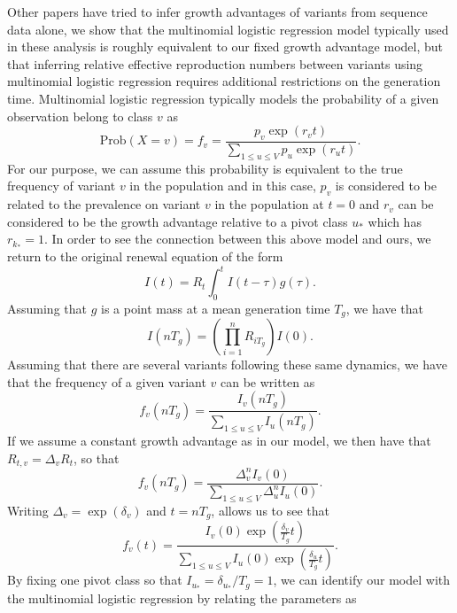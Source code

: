 \documentclass[11pt,oneside,letterpaper]{article}
\begin{document}
Other papers have tried to infer growth advantages of variants from sequence data alone, we show that the multinomial logistic regression model typically used in these analysis is roughly equivalent to our fixed growth advantage model, but that inferring relative effective reproduction numbers between variants using multinomial logistic regression requires additional restrictions on the generation time.
Multinomial logistic regression typically models the probability of a given observation belong to class $v$ as
\begin{equation}
  \text{Prob}(X = v) = f_{v} = \frac{p_{v}\exp(r_{v} t)}{\sum_{1\leq u\leq V} p_{u}\exp(r_{u} t)}.
\end{equation}
For our purpose, we can assume this probability is equivalent to the true frequency of variant $v$ in the population and in this case, $p_{v}$ is considered to be related to the prevalence on variant $v$ in the population at $t=0$ and $r_{v}$ can be considered to be the growth advantage relative to a pivot class $u_{*}$ which has $r_{k_{*}} = 1$.
In order to see the connection between this above model and ours, we return to the original renewal equation of the form
\begin{equation}
  I(t) = R_{t}\int_{0}^{t} I(t-\tau) g(\tau).
\end{equation}
Assuming that $g$  is a point mass at a mean generation time $T_{g}$, we have that
\begin{equation}
  I(nT_{g}) = \left(\prod_{i=1}^{n} R_{iT_{g}}\right) I(0).
\end{equation}
Assuming that there are several variants following these same dynamics, we have that the frequency of a given variant $v$ can be written as
\begin{equation}
  f_{v}(nT_{g}) = \frac{I_{v}(nT_{g})}{\sum_{1\leq u \leq V} I_{u}(nT_{g})}.
\end{equation}
If we assume a constant growth advantage as in our model, we then have that $R_{t,v} = \Delta_{v} R_{t}$, so that
\begin{equation}
  f_{v}(nT_{g}) =  \frac{\Delta_{v}^{n} I_{v}(0)}{\sum_{1\leq u \leq V} \Delta_{u}^{n} I_{u}(0)}.
\end{equation}
Writing $\Delta_{v} = \exp(\delta_{v})$ and $t = n T_{g}$, allows us to see that
\begin{equation}
  f_{v}(t) = \frac{I_{v}(0) \exp(\frac{\delta_{v}}{T_{g}} t)}{\sum_{1\leq u \leq V}I_{u}(0) \exp(\frac{\delta_{u}}{T_{g}} t)}.
\end{equation}
By fixing one pivot class so that $I_{u_{*}} = \delta_{u_{*}} / T_{g} = 1$, we can identify our model with the multinomial logistic regression by relating the parameters as
\end{document}
